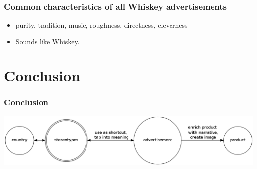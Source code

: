 \documentclass{beamer}
\begin{document}
\begin{frame}
 \frametitle{Common characteristics of all Whiskey advertisements}
 \begin{itemize}
  \item<2->purity, tradition, music, roughness, directness, cleverness
  \item<3->Sounds like Whiskey.
 \end{itemize}
\end{frame}

\section{Conclusion}

\begin{frame}
 \frametitle{Conclusion}
 \includegraphics[scale=.25]{concepts.png}
\end{frame}

\end{document}
